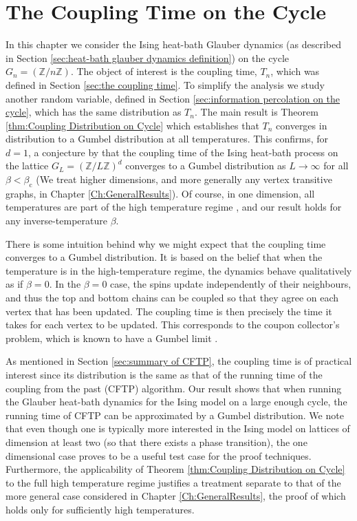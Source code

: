 \chapter{The Coupling Time on the Cycle}
\label{Ch:1D}


	In this chapter we consider the Ising heat-bath Glauber dynamics (as described in Section \ref{sec:heat-bath glauber dynamics definition}) on the cycle $G_n = (\mathbb{Z}/n\mathbb{Z})$. The object of interest is the coupling time, $T_n$, which was defined in Section \ref{sec:the coupling time}. To simplify the analysis we study another random variable, defined in Section \ref{sec:information percolation on the cycle}, which has the same distribution as $T_n$. The main result is Theorem \ref{thm:Coupling Distribution on Cycle} which establishes that $T_n$ converges in distribution to a Gumbel distribution at all temperatures. This confirms, for $d = 1$, a conjecture by \citeauthor{Collevecchio2018-nq} that the coupling time of the Ising heat-bath process on the lattice $G_L = (\mathbb{Z}/L\mathbb{Z})^d$ converges to a Gumbel distribution as $L \rightarrow \infty$ for all $\beta < \beta_\mathrm{c}$ \cite[Conjecture 7.1]{Collevecchio2018-nq} (We treat higher dimensions, and more generally any vertex transitive graphs, in Chapter \ref{Ch:GeneralResults}). Of course, in one dimension, all temperatures are part of the high temperature regime \cite{Friedli2017-xm}, and our result holds for any inverse-temperature $\beta$.

	There is some intuition behind why we might expect that the coupling time converges to a Gumbel distribution. It is based on the belief that when the temperature is in the high-temperature regime, the dynamics behave qualitatively as if $\beta = 0$. In the $\beta = 0$ case, the spins update independently of their neighbours, and thus the top and bottom chains can be coupled so that they agree on each vertex that has been updated. The coupling time is then precisely the time it takes for each vertex to be updated. This corresponds to the coupon collector's problem, which is known to have a Gumbel limit \cite{Erdos1961-ti}.

	As mentioned in Section \ref{sec:summary of CFTP}, the coupling time is of practical interest since its distribution is the same as that of the running time of the coupling from the past (CFTP) algorithm. Our result shows that when running the Glauber heat-bath dynamics for the Ising model on a large enough cycle, the running time of CFTP can be approximated by a Gumbel distribution. We note that even though one is typically more interested in the Ising model on lattices of dimension at least two (so that there exists a phase transition), the one dimensional case proves to be a useful test case for the proof techniques. Furthermore, the applicability of Theorem \ref{thm:Coupling Distribution on Cycle} to the full high temperature regime justifies a treatment separate to that of the more general case considered in Chapter \ref{Ch:GeneralResults}, the proof of which holds only for sufficiently high temperatures.

